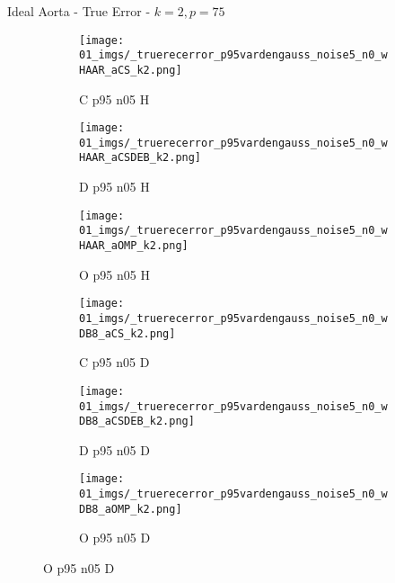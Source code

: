 \begin{frame}{Ideal Aorta - True Error - $k=2,p=75$}{}
\begin{figure}
\begin{subfigure}{0.13\textwidth}
\texttt{[image: 01\_imgs/\_truerecerror\_p95vardengauss\_noise5\_n0\_wHAAR\_aCS\_k2.png]}
\caption*{\tiny C p95 n05 H}
\end{subfigure}
\begin{subfigure}{0.13\textwidth}
\texttt{[image: 01\_imgs/\_truerecerror\_p95vardengauss\_noise5\_n0\_wHAAR\_aCSDEB\_k2.png]}
\caption*{\tiny D p95 n05 H}
\end{subfigure}
\begin{subfigure}{0.13\textwidth}
\texttt{[image: 01\_imgs/\_truerecerror\_p95vardengauss\_noise5\_n0\_wHAAR\_aOMP\_k2.png]}
\caption*{\tiny O p95 n05 H}
\end{subfigure}
\begin{subfigure}{0.13\textwidth}
\texttt{[image: 01\_imgs/\_truerecerror\_p95vardengauss\_noise5\_n0\_wDB8\_aCS\_k2.png]}
\caption*{\tiny C p95 n05 D}
\end{subfigure}
\begin{subfigure}{0.13\textwidth}
\texttt{[image: 01\_imgs/\_truerecerror\_p95vardengauss\_noise5\_n0\_wDB8\_aCSDEB\_k2.png]}
\caption*{\tiny D p95 n05 D}
\end{subfigure}
\begin{subfigure}{0.13\textwidth}
\texttt{[image: 01\_imgs/\_truerecerror\_p95vardengauss\_noise5\_n0\_wDB8\_aOMP\_k2.png]}
\caption*{\tiny O p95 n05 D}
\end{subfigure}

\vspace{5pt}


\end{figure}
\end{frame}
